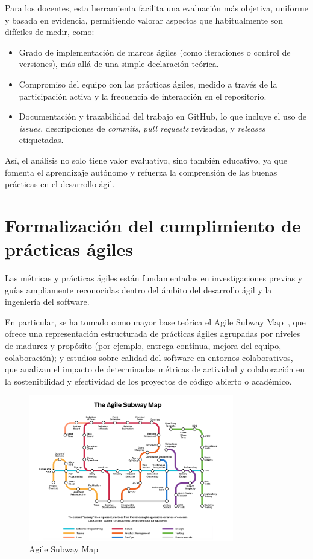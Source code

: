 Para los docentes, esta herramienta facilita una evaluación más objetiva, uniforme y basada en evidencia, permitiendo valorar aspectos que habitualmente son difíciles de medir, como:

\begin{itemize}
\item Grado de implementación de marcos ágiles (como iteraciones o control de versiones), más allá de una simple declaración teórica.
\item Compromiso del equipo con las prácticas ágiles, medido a través de la participación activa y la frecuencia de interacción en el repositorio.
\item Documentación y trazabilidad del trabajo en GitHub, lo que incluye el uso de \textit{issues}, descripciones de \textit{commits}, \textit{pull requests} revisadas, y \textit{releases} etiquetadas.
\end{itemize}

Así, el análisis no solo tiene valor evaluativo, sino también educativo, ya que fomenta el aprendizaje autónomo y refuerza la comprensión de las buenas prácticas en el desarrollo ágil.

\section{Formalización del cumplimiento de prácticas ágiles}

Las métricas y prácticas ágiles están fundamentadas en investigaciones previas y guías ampliamente reconocidas dentro del ámbito del desarrollo ágil y la ingeniería del software. 

En particular, se ha tomado como mayor base teórica el Agile Subway Map~\cite{agileSubwayMap}, que ofrece una representación estructurada de prácticas ágiles agrupadas por niveles de madurez y propósito (por ejemplo, entrega continua, mejora del equipo, colaboración); y estudios sobre calidad del software en entornos colaborativos, que analizan el impacto de determinadas métricas de actividad y colaboración en la sostenibilidad y efectividad de los proyectos de código abierto o académico.

\begin{figure}[H]
\centering
\includegraphics[width=0.8\textwidth]{img/3.1 Agile Subway Map.png}
\caption{Agile Subway Map}
\label{fig:Agile Subway Map}
\end{figure}

